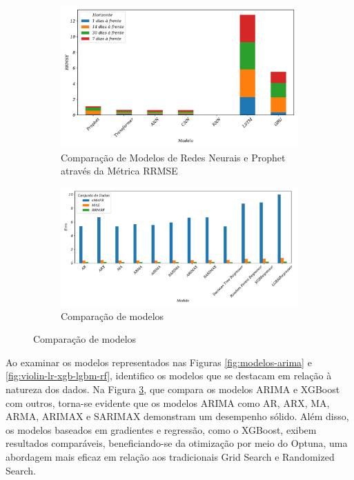 \begin{figure}[!htb]
	\centering
	\caption{Análise Comparativa dos Modelos Utilizando Gráfico de Barras}
		\begin{subfigure}{0.9\textwidth}
		\includegraphics[width=\linewidth]{Resultados/Figuras/rrmse_comparar}
		\caption{Comparação de Modelos de Redes Neurais e Prophet através da Métrica RRMSE}
		\label{fig:rrmse_comparar}
	\end{subfigure}
	
	\begin{subfigure}{0.9\textwidth}
		\includegraphics[width=\linewidth]{Resultados/Figuras/basic_comparar}
		\caption{Comparação de modelos}
		\label{fig:basic_comparar}
	\end{subfigure}
	
\end{figure}



Ao examinar os modelos representados nas Figuras \ref{fig:modelos-arima} e \ref{fig:violin-lr-xgb-lgbm-rf}, identifico os modelos que se destacam em relação à natureza dos dados. Na Figura \ref{fig:basic_comparar}, que compara os modelos ARIMA e XGBoost com outros, torna-se evidente que os modelos ARIMA como AR, ARX, MA, ARMA, ARIMAX e SARIMAX demonstram um desempenho sólido. Além disso, os modelos baseados em gradientes e regressão, como o XGBoost, exibem resultados comparáveis, beneficiando-se da otimização por meio do Optuna, uma abordagem mais eficaz em relação aos tradicionais Grid Search e Randomized Search.

